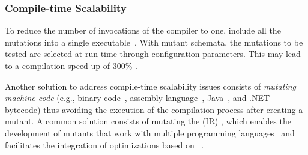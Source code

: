 %

\subsubsection{Compile-time Scalability}
\label{sec:compile:time}


To reduce the number of invocations of the compiler to one,  include all the mutations into a single executable~\cite{untch1993mutation}. 
With mutant schemata, the mutations to be tested are selected at run-time through configuration parameters. This may lead to a compilation speed-up of 300\% \cite{papadakis2010automatic}. 


Another solution to address compile-time scalability issues consists of \emph{mutating machine code}  (e.g., binary code~\cite{becker2012xemu}, assembly language~\cite{crouzet2006sesame},
Java~\cite{ma2006mujava}, 
 and
.NET~\cite{derezinska2011object} bytecode) thus avoiding the execution of the compilation process after creating a mutant. 
A common solution consists of mutating the
  (IR) \cite{hariri2016evaluating}, 
which enables the development of mutants that work with multiple programming languages~\cite{hariri2019comparing} and facilitates the integration of optimizations based on ~\cite{denisov2018mull}.


